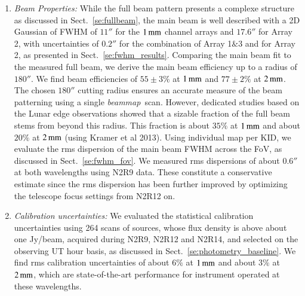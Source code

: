 \documentclass{aa}
\newcommand{\bm}{\emph{beammap}}
\begin{document}
\begin{enumerate}
\item \emph{Beam Properties:} While the full beam pattern presents a complexe structure as discussed
  in Sect.~\ref{se:fullbeam}, the main beam is well described with a 2D
  Gaussian of FWHM of $11''$ for the $1\,\rm{mm}$ channel arrays
  and $17.6''$ for Array 2, with uncertainties of  $0.2''$ for the
  combination of Array 1$\&$3 and for Array 2, as presented in
  Sect.~\ref{se:fwhm_results}.
  Comparing the main beam fit to the measured full beam, we derive the
  main beam efficiency up to a radius of $180''$. We find beam
  efficiencies of $55 \pm 3 \%$ at $1\,\rm{mm}$ and $77 \pm 2 \%$ at
  $2\,\rm{mm}$. %
  The chosen $180''$ cutting radius ensures an accurate
  measure of the beam patterning using a single \bm\ scan. However,
  dedicated studies based on the Lunar edge observations showed that
  a sizable fraction of the full beam stems from beyond this
  radius. This fraction is about $35\%$ at $1\,\rm{mm}$ and about $20\%$
  at $2\,\rm{mm}$ (using Kramer et al 2013). Using individual map per
  KID, we evaluate the rms dispersion of the main beam FWHM across the
  FoV, as discussed in Sect.~\ref{se:fwhm_fov}. We measured rms
  dispersions of about $0.6''$ at both wavelengths using N2R9 data. These
  constitute a conservative estimate since the rms dispersion has been
  further improved by optimizing the telescope focus settings from N2R12
  on.  

\item \emph{Calibration uncertainties:} We evaluated the statistical calibration uncertainties using 264 
  scans of sources, whose flux density is above about one Jy/beam,
  acquired during N2R9, N2R12 and N2R14, and selected on the observing UT hour basis, as discussed in
  Sect.~\ref{se:photometry_baseline}. We find rms calibration
  uncertainties of about $6\%$ at $1\,\rm{mm}$ and about $3\%$ at
  $2\,\rm{mm}$, which are state-of-the-art performance for instrument
  operated at these wavelengths. 
  


\end{enumerate}
\end{document}
